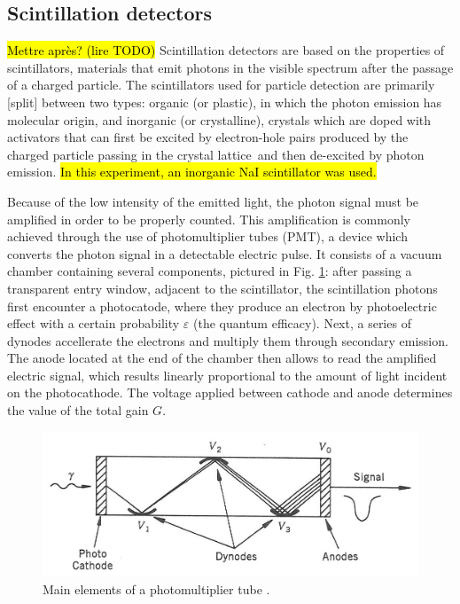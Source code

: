 \subsection{Scintillation detectors} \hl{Mettre après? (lire TODO)}
Scintillation detectors are based on the properties of scintillators, materials that emit photons in the visible spectrum after the passage of a charged particle.
The scintillators used for particle detection are primarily [split] between two types: organic (or plastic), in which the photon emission has molecular origin, 
and inorganic (or crystalline), crystals which are doped with activators that can first be excited by electron-hole pairs 
produced by the charged particle passing in the crystal lattice\footnotemark\ and then de-excited by photon emission\cite{intro_nuclear_particle_physics}.
\hl{In this experiment, an inorganic NaI scintillator was used.}

Because of the low intensity of the emitted light, the photon signal must be amplified in order to be properly counted.
This amplification is commonly achieved through the use of photomultiplier tubes (PMT), a device which converts the photon signal in a detectable electric pulse.
It consists of a vacuum chamber containing several components, pictured in Fig. \ref{fig:photomultiplier}: 
after passing a transparent entry window, adjacent to the scintillator, the scintillation photons first encounter a photocatode, 
where they produce an electron by photoelectric effect with a certain probability $\varepsilon$ (the quantum efficacy).
Next, a series of dynodes accellerate the electrons and multiply them through secondary emission.
The anode located at the end of the chamber then allows to read the amplified electric signal, 
which results linearly proportional to the amount of light incident on the photocathode.
The voltage applied between cathode and anode determines the value of the total gain $G$.
%
\begin{figure}[htbp]
    \centering
    \includegraphics[scale=1.2]{figures/photomultiplier.jpg}
    \caption{Main elements of a photomultiplier tube \cite{intro_nuclear_particle_physics}.}
    \label{fig:photomultiplier}
\end{figure}

